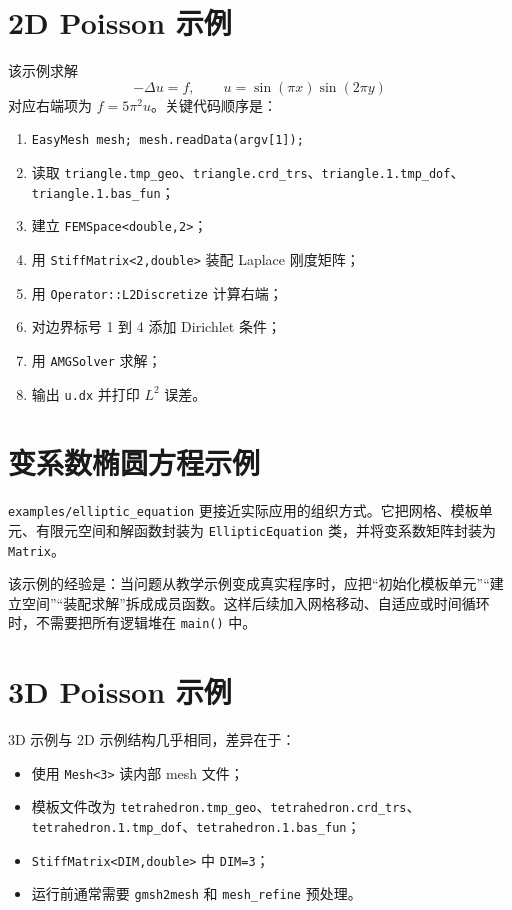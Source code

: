 \documentclass[UTF8,openany,zihao=-4,scheme=chinese]{ctexbook}
\newcommand{\file}[1]{\nolinkurl{#1}}
\newcommand{\class}[1]{\texttt{#1}}
\newcommand{\cmd}[1]{\texttt{#1}}
\begin{document}
\section{2D Poisson 示例}

该示例求解
\[
  -\Delta u = f,\qquad
  u = \sin(\pi x)\sin(2\pi y)
\]
对应右端项为 $f=5\pi^2u$。关键代码顺序是：

\begin{enumerate}[leftmargin=2em]
  \item \class{EasyMesh mesh; mesh.readData(argv[1]);}
  \item 读取 \file{triangle.tmp_geo}、\file{triangle.crd_trs}、\file{triangle.1.tmp_dof}、\file{triangle.1.bas_fun}；
  \item 建立 \class{FEMSpace<double,2>}；
  \item 用 \class{StiffMatrix<2,double>} 装配 Laplace 刚度矩阵；
  \item 用 \class{Operator::L2Discretize} 计算右端；
  \item 对边界标号 1 到 4 添加 Dirichlet 条件；
  \item 用 \class{AMGSolver} 求解；
  \item 输出 \file{u.dx} 并打印 $L^2$ 误差。
\end{enumerate}

\section{变系数椭圆方程示例}

\file{examples/elliptic_equation} 更接近实际应用的组织方式。它把网格、模板单元、有限元空间和解函数封装为 \class{EllipticEquation} 类，并将变系数矩阵封装为 \class{Matrix}。

该示例的经验是：当问题从教学示例变成真实程序时，应把“初始化模板单元”“建立空间”“装配求解”拆成成员函数。这样后续加入网格移动、自适应或时间循环时，不需要把所有逻辑堆在 \class{main()} 中。

\section{3D Poisson 示例}

3D 示例与 2D 示例结构几乎相同，差异在于：

\begin{itemize}[leftmargin=2em]
  \item 使用 \class{Mesh<3>} 读内部 mesh 文件；
  \item 模板文件改为 \file{tetrahedron.tmp_geo}、\file{tetrahedron.crd_trs}、\file{tetrahedron.1.tmp_dof}、\file{tetrahedron.1.bas_fun}；
  \item \class{StiffMatrix<DIM,double>} 中 \cmd{DIM=3}；
  \item 运行前通常需要 \file{gmsh2mesh} 和 \file{mesh_refine} 预处理。
\end{itemize}
\end{document}
